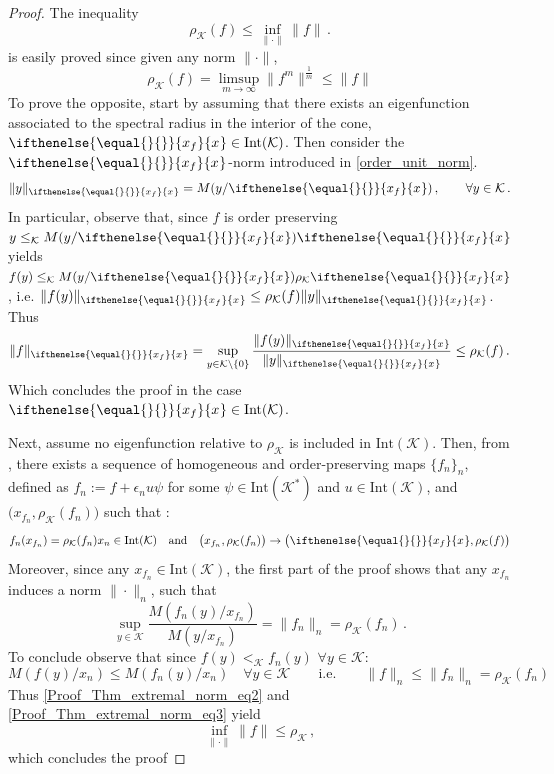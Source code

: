 \documentclass{article}
\newcommand{\cradius}{\rho_{\cone}}
\newcommand{\cone}{\mathcal{K}}
\newcommand{\interior}{\mathrm{Int}}
\newcommand{\cleq}{\leq_{\cone}}
\newcommand{\cl}{<_{\cone}}
\newcommand{\ceigenvector}[1][]{
  \ifthenelse{\equal{#1}{}}
  {{x_f}}
  {{x}_{#1}}}
\begin{document}
\begin{proof}
    The inequality 
\begin{equation}
\cradius(f)\leq\inf_{\|\cdot\|}\|f\|\,.
\end{equation}
is easily proved since given any norm $\|\cdot\|$, 
\begin{equation}
\cradius(f)=\limsup_{m\rightarrow\infty}\|f^m\|^{\frac{1}{m}}\leq \|f\|
\end{equation}
To prove the opposite, start by assuming that there exists an eigenfunction associated to the spectral radius in the interior of the cone, $\ceigenvector\in\interior(\cone)$. Then consider the $\ceigenvector$-norm introduced in \eqref{order_unit_norm}.
%
\begin{equation}
   \|y\|_{\ceigenvector}=M(y/\ceigenvector)\,, \qquad \forall y\in\cone\,.
\end{equation}
%
In particular, observe that, since $f$ is order preserving $y\cleq M(y/\ceigenvector)\ceigenvector$ yields $f(y)\cleq M(y/\ceigenvector)\cradius\ceigenvector$,
i.e. $\|f(y)\|_{\ceigenvector}\leq \cradius(f) \|y\|_{\ceigenvector}$. Thus 
%
\begin{equation}
\|f\|_{\ceigenvector}=\sup_{y\in\cone\setminus\{0\}}\frac{\|f(y)\|_{\ceigenvector}}{\|y\|_{\ceigenvector}}\leq \cradius(f)\,.
\end{equation}
Which concludes the proof in the case $\ceigenvector\in\interior(\cone)$.

Next, assume no eigenfunction relative to $\cradius$ is included in $\interior(\cone)$. Then, from , there exists a sequence of homogeneous and order-preserving maps $\{f_{n}\}_{n}$, defined as $f_n:=f+\epsilon_n u \psi$ for some $\psi\in\interior(\cone^*)$ and $u\in\interior(\cone)$, and $\big(x_{f_n},\cradius(f_{n})\big)$ such that :
%
\begin{equation}\label{Proof_Thm_extremal_norm_eq2}
f_{n}(x_{f_n})=\cradius(f_{n})x_{n}\in \interior(\cone)\quad \mathrm{and}\quad \big(x_{f_n},\cradius(f_{n})\big)\rightarrow \big(\ceigenvector,\cradius(f)\big)
\end{equation}
Moreover, since any $x_{f_n}\in\interior(\cone)$, the first part of the proof shows that any $x_{f_n}$ induces a norm $\|\cdot\|_{n}$, such that
\begin{equation}
\sup_{y\in \cone}\frac{M(f_{n}(y)/ x_{f_{n}})}{M(y/ x_{f_{n}})}=\|f_{n}\|_{n}=\cradius(f_{n})\,.
\end{equation}
To conclude observe that since $f(y)\cl f_{n}(y)$ $\forall y\in\cone$: 
\begin{equation}\label{Proof_Thm_extremal_norm_eq3}
M(f(y)/x_{n})\leq M(f_{n}(y)/x_{n})\quad \forall y\in\cone \qquad \mathrm{i.e.}\qquad \|f\|_{n}\leq \|f_{n}\|_{n}=\cradius(f_{n})
\end{equation}
Thus \eqref{Proof_Thm_extremal_norm_eq2} and  \eqref{Proof_Thm_extremal_norm_eq3} yield
\begin{equation}
    \inf_{\|\cdot\|}\|f\|\leq  \cradius\,,
\end{equation}
which concludes the proof
\end{proof}
\end{document}
